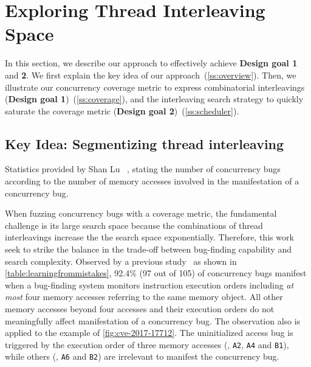 \section{Exploring Thread Interleaving Space}
\label{s:design}

In this section, we describe our approach to effectively achieve
\textbf{Design goal 1} and \textbf{2}.
%
We first explain the key idea of our approach~(\autoref{ss:overview}). 
Then, we illustrate our concurrency
coverage metric to express combinatorial interleavings 
(\textbf{Design goal 1})~(\autoref{ss:coverage}), and the interleaving search strategy
to quickly saturate the coverage metric (\textbf{Design goal 2})~(\autoref{ss:scheduler}).


\subsection{Key Idea: Segmentizing thread interleaving}
\label{ss:overview}

\begin{table}[t]
  \centering
  
  \caption{Statistics provided by Shan Lu
    \etal~\cite{learningfrommistakes}, stating the number of
    concurrency bugs according to the number of memory accesses
    involved in the manifestation of a concurrency bug.  }
  \label{table:learningfrommistakes}
\end{table}

When fuzzing concurrency bugs with a coverage metric, the fundamental challenge is its large search space because
the combinations of thread interleavings increase the 
the search space exponentially. Therefore, this work seek to 
strike the balance
in the trade-off between bug-finding capability and search 
complexity. Observed by a previous study~\cite{learningfrommistakes}
as shown in \autoref{table:learningfrommistakes}, 92.4\% (97 out of
105) of concurrency bugs manifest when a bug-finding system 
monitors instruction execution orders including \textit{at most} 
four memory accesses referring to the same memory object.
All other memory
accesses beyond four accesses and their execution orders do not
meaningfully affect manifestation of a concurrency bug. 
The observation also is applied to the example of \autoref{fig:cve-2017-17712}. The uninitialized access bug is triggered by 
the execution order of three
memory accesses (\eg, \texttt{A2}, \texttt{A4} and \texttt{B1}), while
others (\eg, \texttt{A6} and \texttt{B2}) are irrelevant to manifest the
concurrency bug.


